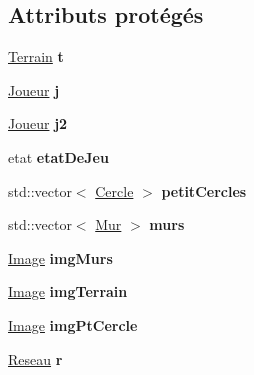 \subsection*{Attributs protégés}
\begin{DoxyCompactItemize}
\item 
\mbox{\label{class_jeu_a906acfd427c1a7493ed56ee385c4c96d}} 
\mbox{\hyperlink{class_terrain}{Terrain}} {\bfseries t}
\item 
\mbox{\label{class_jeu_a9699ce0488a9a79d352a9d41944c0cf0}} 
\mbox{\hyperlink{class_joueur}{Joueur}} {\bfseries j}
\item 
\mbox{\label{class_jeu_ac89385af0cda0c4ee69f35711cbb27ef}} 
\mbox{\hyperlink{class_joueur}{Joueur}} {\bfseries j2}
\item 
\mbox{\label{class_jeu_a232a6e57d98354a292a1a48638b56d62}} 
etat {\bfseries etat\+De\+Jeu}
\item 
\mbox{\label{class_jeu_afedfece7a340c1d8a932fa5681ef0690}} 
std\+::vector$<$ \mbox{\hyperlink{class_cercle}{Cercle}} $>$ {\bfseries petit\+Cercles}
\item 
\mbox{\label{class_jeu_a16a1607eaddefe244ee7b488ba85553e}} 
std\+::vector$<$ \mbox{\hyperlink{class_mur}{Mur}} $>$ {\bfseries murs}
\item 
\mbox{\label{class_jeu_a056e9a0a76a2c2ad4c0e4eee4a1aba6e}} 
\mbox{\hyperlink{class_image}{Image}} {\bfseries img\+Murs}
\item 
\mbox{\label{class_jeu_a5aa88417a6ac07fbdce37a7177931dcc}} 
\mbox{\hyperlink{class_image}{Image}} {\bfseries img\+Terrain}
\item 
\mbox{\label{class_jeu_a628cbea928144cda417838f36c0f68c6}} 
\mbox{\hyperlink{class_image}{Image}} {\bfseries img\+Pt\+Cercle}
\item 
\mbox{\label{class_jeu_a468837ca209663bf2e9ef9c87e403064}} 
\mbox{\hyperlink{class_reseau}{Reseau}} {\bfseries r}
\item 
\mbox{\label{class_jeu_a8b6f2510eb9a2e6e257a76d2b71f12b9}} 

\end{DoxyCompactItemize}
